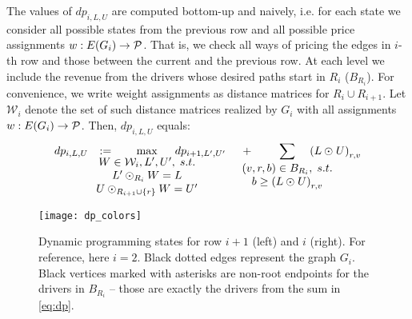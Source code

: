 The values of $dp_{i, L, U}$ are computed bottom-up and naively, i.e. for each state we consider
all possible states from the previous row and all possible price assignments $w: E(G_i) \rightarrow \mathcal{P}$.
That is, we check all ways of pricing the edges in $i$-th row and those between the current and the previous row.
At each level we include the revenue from the drivers whose desired paths start in $R_i$ ($B_{R_i}$).
For convenience, we write weight assignments as distance matrices for $R_i \cup R_{i+1}$.
Let $\mathcal{W}_i$ denote the set of such distance matrices realized by $G_i$ with all assignments $w: E(G_i) \rightarrow \mathcal{P}$.
Then, $dp_{i, L, U}$ equals:%
%
\begin{equation}
\label{eq:dp}
dp_{i, L, U} \hspace{0.27cm} := \hspace{-0.75cm} 
\max_{
    \begin{array}{c} W \in \mathcal{W}_i, L', U', \; s.t. \\
    L' \dpro{R_i} W = L \\
    U \dpro{R_{i+1} \cup \set{r}} W = U' \end{array}} \hspace{-0.95cm}
    dp_{i+1, L', U'}
    \hspace{0.45cm} + \hspace{-0.55cm}
    \sum_{
    \begin{array}{c} (v, r, b) \in B_{R_i}, \; s.t. \\
    b \geq \bra{L \dpro{} U}_{r, v} \end{array}}
    \hspace{-0.95cm}\bra{L \dpro{} U}_{r, v}
\end{equation}

\begin{figure}[t]
    \centering
    \texttt{[image: dp\_colors]}
    \caption{
        Dynamic programming states for row $i+1$ (left) and $i$ (right).
        For reference, here $i = 2$.
        Black dotted edges represent the graph $G_i$.
        Black vertices marked with asterisks are
        non-root endpoints for the drivers in $B_{R_i}$ -- those are exactly the drivers from the sum in \cref{eq:dp}.
    }

\end{figure}

